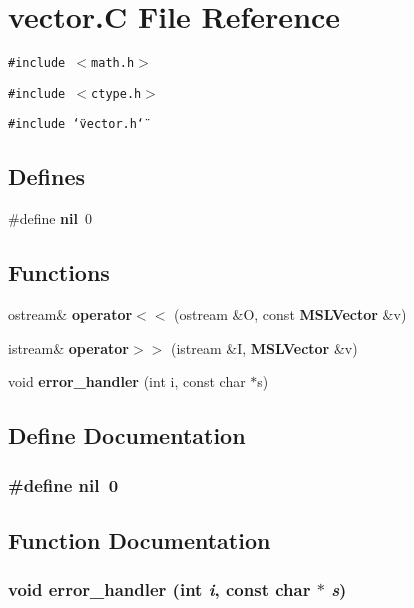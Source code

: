 \section{vector.C File Reference}
\label{vector_8C}
{\tt \#include $<$math.h$>$}\par
{\tt \#include $<$ctype.h$>$}\par
{\tt \#include \char`\"{}vector.h\char`\"{}}\par
\subsection*{Defines}
\begin{CompactItemize}
\item 
\#define {\bf nil}\ 0
\end{CompactItemize}
\subsection*{Functions}
\begin{CompactItemize}
\item 
ostream\& {\bf operator$<$$<$} (ostream \&O, const {\bf MSLVector} \&v)
\item 
istream\& {\bf operator$>$$>$} (istream \&I, {\bf MSLVector} \&v)
\item 
void {\bf error\_\-handler} (int i, const char $\ast$s)
\end{CompactItemize}


\subsection{Define Documentation}
\subsubsection{\setlength{\rightskip}{0pt plus 5cm}\#define nil\ 0}\label{vector_8C_a0}




\subsection{Function Documentation}
\subsubsection{\setlength{\rightskip}{0pt plus 5cm}void error\_\-handler (int {\em i}, const char $\ast$ {\em s})}\label{vector_8C_a3}


